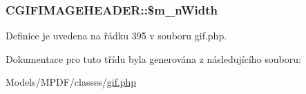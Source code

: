 \hypertarget{class_c_g_i_f_i_m_a_g_e_h_e_a_d_e_r_acd756cc46a06841324c277da1c197d66}{
\subsubsection[{\$m\-\_\-n\-Width}]{\setlength{\rightskip}{0pt plus 5cm}C\-G\-I\-F\-I\-M\-A\-G\-E\-H\-E\-A\-D\-E\-R\-::\$m\-\_\-n\-Width}}\label{class_c_g_i_f_i_m_a_g_e_h_e_a_d_e_r_acd756cc46a06841324c277da1c197d66}


Definice je uvedena na řádku 395 v souboru gif.\-php.



Dokumentace pro tuto třídu byla generována z následujícího souboru\-:\begin{DoxyCompactItemize}
\item 
Models/\-M\-P\-D\-F/classes/\hyperlink{gif_8php}{gif.\-php}\end{DoxyCompactItemize}
